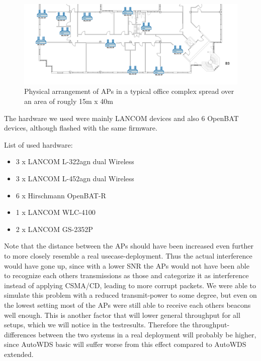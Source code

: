       \begin{figure}[h!]
	\centering
	\includegraphics[width=\columnwidth]{figures/Lancom-flur-withaps}
	\caption{Physical arrangement of APs in a typical office complex spread over an area of rougly 15m x 40m}
	\label{fig:2ndfloor}
      \end{figure}
      
      The hardware we used were mainly LANCOM devices and also 6 OpenBAT devices, although flashed with the same firmware.
     
      List of used hardware:
      \begin{itemize}
	\item 3 x LANCOM L-322agn dual Wireless \cite{lancom}
	\item 3 x LANCOM L-452agn dual Wireless
	\item 6 x Hirschmann OpenBAT-R
	\item 1 x LANCOM WLC-4100
	\item 2 x LANCOM GS-2352P
      \end{itemize}
      
      Note that the distance between the APs should have been increased even further to more closely resemble a real usecase-deployment.
      Thus the actual interference would have gone up, since with a lower \ac{SNR} the APs would not have been able to recognize each others 
      transmissions as those and categorize it as interference instead of applying CSMA/CD, leading to more corrupt packets.
      We were able to simulate this problem with a reduced transmit-power to some degree,
      but even on the lowest setting most of the APs were still able to receive each others beacons well enough. 
      This is another factor that will lower general throughput for all setups, which we will notice in the testresults.
      Therefore the throughput-differences between the two systems in a real deployment will probably be higher, since AutoWDS basic will suffer worse from this effect 
      compared to AutoWDS extended.
    
